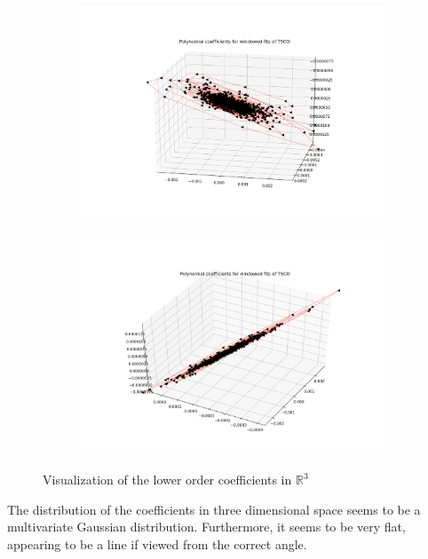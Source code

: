 \documentclass[final]{article}
\begin{document}
\begin{figure}[H]
  \centering
  \begin{subfigure}{.45\textwidth}
    \centering
    \includegraphics[width=\linewidth]{img/coeff1}
  \end{subfigure}
  \begin{subfigure}{.45\textwidth}
    \centering
    \includegraphics[width=\linewidth]{img/coeff2}
  \end{subfigure}
  \caption{Visualization of the lower order coefficients in $\mathbb{R}^3$}
  \label{fig:coeff12}
\end{figure}

The distribution of the coefficients in three dimensional space seems
to be a multivariate Gaussian distribution. Furthermore, it seems to
be very flat, appearing to be a line if viewed from the correct angle.
\end{document}
